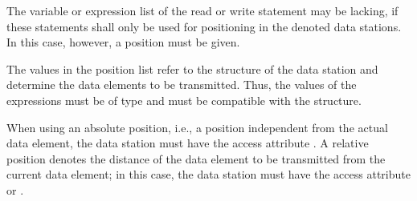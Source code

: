 The variable or expression list of the read or write statement may be
lacking, if these statements shall only be used for positioning in the
denoted data stations. In this case, however, a position must be
given.

The values in the position list refer to the structure of the data
station and determine the data elements to be transmitted. Thus, the
values of the expressions must be of type  and must be compatible
with the structure.

When using an absolute position, i.e., a position independent from the
actual data element, the data station must have the access attribute
. A relative position denotes the distance of the data element to
be transmitted from the current data element; in this case, the data
station must have the access attribute 
 or .

